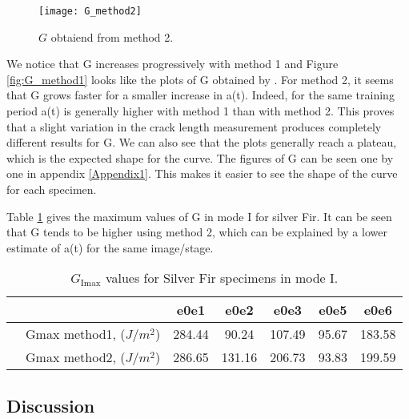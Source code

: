 \begin{figure}[htp]
	\centering
	\texttt{[image: G\_method2]}
	\caption{$G$ obtaiend from method 2.}
	\label{fig:G_method2}
\end{figure}

We notice that G increases progressively with method 1 and Figure \ref{fig:G_method1} looks like the plots of G obtained by \cite{Odounga2018phd}. For method 2, it seems that G grows faster for a smaller increase in a(t). Indeed, for the same training period a(t) is generally higher with method 1 than with method 2. This proves that a slight variation in the crack length measurement produces completely different results for G. We can also see that the plots generally reach a plateau, which is the expected shape for the curve.
The figures of G can be seen one by one in appendix \ref{Appendix1}. This makes it easier to see the shape of the curve for each specimen.

Table \ref{fig:tableG1} gives the maximum values of G in mode I for silver Fir. It can be seen that G tends to be higher using method 2, which can be explained by a lower estimate of a(t) for the same image/stage.

\begin{table} [H]
	\centering
	\begin{tabular}{ccccccc}
		\toprule %
		&  & e0e1 & e0e2 & e0e3 & e0e5 & e0e6\\\midrule
		& Gmax method1, ($J/m^2$) & 284.44 & 90.24 & 107.49 & 95.67 & 183.58 \\\midrule
		& Gmax method2, ($J/m^2$) & 286.65 & 131.16 & 206.73 & 93.83 & 199.59 \\\midrule
	\end{tabular}
	\caption{$G_\text{Imax}$ values for Silver Fir specimens in mode I.}
	\label{fig:tableG1}
\end{table}

\subsection{Discussion}

